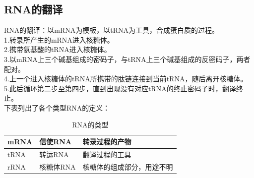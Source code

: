 \documentclass[UTF8]{ctexart}
\begin{document}
\subsection{RNA的翻译}
    RNA的翻译：以mRNA为模板，以tRNA为工具，合成蛋白质的过程。\\[3mm]
    1.转录所产生的mRNA进入核糖体。\\[3mm]
    2.携带氨基酸的tRNA进入核糖体。\\[3mm]
    3.以mRNA上三个碱基组成的密码子，与tRNA上三个碱基组成的反密码子，两者配对。\\[3mm]
    4.上一个进入核糖体的tRNA所携带的肽链连接到当前tRNA，随后离开核糖体。\\[3mm]
    5.此后循环第二步至第四步，直到出现没有对应tRNA的终止密码子时，翻译终止。\\[6mm]
    下表列出了各个类型RNA的定义：
    \begin{table}[h]
        \begin{center}
            \begin{tabular}{l|l|l}
                \hline
                mRNA\qquad\qquad&信使RNA\qquad\qquad&转录过程的产物\qquad\qquad\\ \hline
                tRNA\qquad\qquad&转运RNA\qquad\qquad&翻译过程的工具\qquad\qquad\\ \hline
                rRNA\qquad\qquad&核糖体RNA\qquad\qquad&核糖体的组成部分，用途不明\qquad\qquad\\ \hline
            \end{tabular}
            \caption{RNA的类型}
        \end{center}
    \end{table}

\newpage
\end{document}
